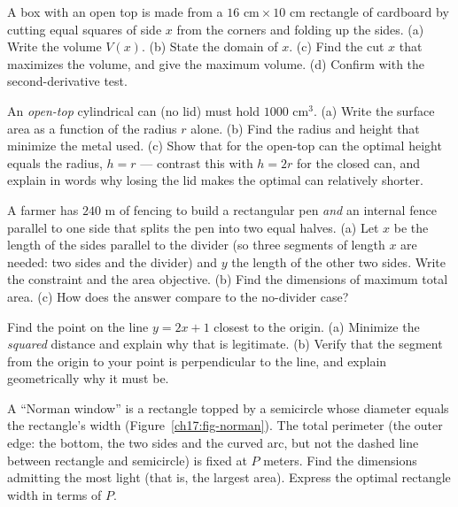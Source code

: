 \begin{exercise}
A box with an open top is made from a $16\text{ cm}\times 10\text{ cm}$ rectangle of
cardboard by cutting equal squares of side $x$ from the corners and folding up the
sides. (a) Write the volume $V(x)$. (b) State the domain of $x$. (c) Find the cut $x$
that maximizes the volume, and give the maximum volume. (d) Confirm with the
second-derivative test.
\end{exercise}

\begin{exercise}
An \emph{open-top} cylindrical can (no lid) must hold $1000\text{ cm}^3$. (a) Write
the surface area as a function of the radius $r$ alone. (b) Find the radius and height
that minimize the metal used. (c) Show that for the open-top can the optimal height
equals the radius, $h=r$ --- contrast this with $h=2r$ for the closed can, and explain
in words why losing the lid makes the optimal can relatively shorter.
\end{exercise}

\begin{exercise}
A farmer has $240$ m of fencing to build a rectangular pen \emph{and} an internal
fence parallel to one side that splits the pen into two equal halves. (a) Let $x$ be
the length of the sides parallel to the divider (so three segments of length $x$ are
needed: two sides and the divider) and $y$ the length of the other two sides. Write the constraint and the area objective. (b) Find the dimensions of
maximum total area. (c) How does the answer compare to the no-divider case?
\end{exercise}

\begin{exercise}
Find the point on the line $y = 2x + 1$ closest to the origin. (a) Minimize the
\emph{squared} distance and explain why that is legitimate. (b) Verify that the
segment from the origin to your point is perpendicular to the line, and explain
geometrically why it must be.
\end{exercise}

\begin{exercise}
A ``Norman window'' is a rectangle topped by a semicircle whose diameter equals the
rectangle's width (Figure~\ref{ch17:fig-norman}). The total perimeter (the outer
edge: the bottom, the two sides and the curved arc, but not the dashed line between
rectangle and semicircle) is fixed at $P$ meters. Find the dimensions admitting the
most light (that is, the largest area). Express the optimal rectangle width in terms
of $P$.
\end{exercise}

